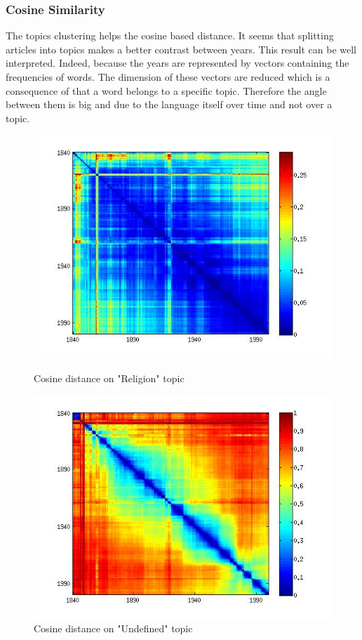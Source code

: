 \subsubsection{Cosine Similarity}

The topics clustering helps the cosine based distance. It seems that splitting articles into topics makes a better contrast between years. This result can be well interpreted. Indeed, because the years are represented by vectors containing the frequencies of words. The dimension of these vectors are reduced which is a consequence of that a word belongs to a specific topic. Therefore the angle between them is big and due to the language itself over time and not over a topic. 

\begin{figure}[H]
    \begin{minipage}[b]{0.48\linewidth}
        \includegraphics[scale=0.3]{Pictures/topics/cos/topic1.jpg}
        \caption{Cosine distance on "Religion" topic}
        \label{cos_topic1}
    \end{minipage}\hfill
    \begin{minipage}[b]{0.5\linewidth}
        \includegraphics[scale=0.3]{Pictures/topics/cos/topic3.jpg}
        \caption{Cosine distance on "Undefined" topic}
        \label{cos_topic3}
    \end{minipage}\hfill
\end{figure}

